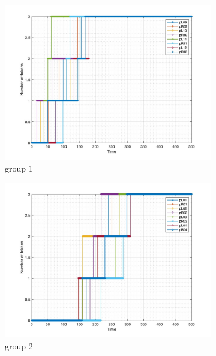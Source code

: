 \documentclass[english]{article}
\begin{document}
\begin{figure}[H]
     \centering
     \begin{subfigure}[b]{0.3\textwidth}
         \centering
         \includegraphics[width=\textwidth]{figures/group1.jpg}
         \caption{group 1}
         \label{fig:group1}
     \end{subfigure}
     \hfill
     \begin{subfigure}[b]{0.3\textwidth}
         \centering
         \includegraphics[width=\textwidth]{figures/group2.jpg}
         \caption{group 2}
         \label{fig:group2}
     \end{subfigure}
     \hfill
     \begin{subfigure}[b]{0.3\textwidth}

\end{subfigure}
\end{figure}
\end{document}
